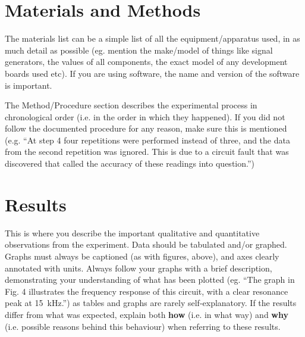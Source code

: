 \documentclass[11pt, a4paper]{article}
\begin{document}
\section{Materials and Methods}

The materials list can be a simple list of all the equipment/apparatus used, in as much detail as possible (eg. mention the make/model of things like signal generators, the values of all components, the exact model of any development boards used etc). If you are using software, the name and version of the software is important.

The Method/Procedure section describes the experimental process in chronological order (i.e. in the order in which they happened). If you did not follow the documented procedure for any reason, make sure this is mentioned (e.g. ``At step 4 four repetitions were performed instead of three, and the data from the second repetition was ignored. This is due to a circuit fault that was discovered that called the accuracy of these readings into question.'')

%


\section{Results}

This is where you describe the important qualitative and quantitative observations from the experiment. Data should be tabulated and/or graphed. Graphs must always be captioned (as with figures, above), and axes clearly annotated with units. Always follow your graphs with a brief description, demonstrating your understanding of what has been plotted (eg. ``The graph in Fig. 4 illustrates the frequency response of this circuit, with a clear resonance peak at 15~kHz.'') as tables and graphs are rarely self-explanatory. If the results differ from what was expected, explain both \textbf{how} (i.e. in what way) and \textbf{why} (i.e. possible reasons behind this behaviour) when referring to these results. 
\end{document}
